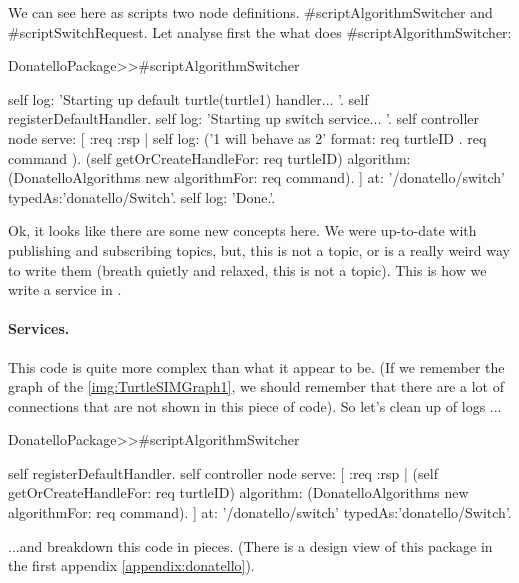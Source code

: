 \documentclass[a4paper,10pt,twoside]{book}
\begin{document}
			
			We can see here as scripts two node definitions. \#scriptAlgorithmSwitcher and \#scriptSwitchRequest. Let analyse first the what does \#scriptAlgorithmSwitcher:
			
			
			
			\begin{code}

DonatelloPackage>>#scriptAlgorithmSwitcher

	self log: 'Starting up default turtle(turtle1) handler... '.
	self registerDefaultHandler.
	self log: 'Starting up switch service... '.
	self controller node serve: [ :req :rsp | 
		self log: ('{1} will behave as {2}' format: {req turtleID . req command} ).
		(self getOrCreateHandleFor: req turtleID)  algorithm: (DonatelloAlgorithms new algorithmFor: req command).		
	] at: '/donatello/switch' typedAs:'donatello/Switch'.
	self log: 'Done.'.

			\end{code}
			
			
			Ok, it looks like there are some new concepts here. We were up-to-date with publishing and subscribing topics, but,  this is not a topic, or is a really weird way to write them (breath quietly and relaxed, this is not a topic). This is how we write a service in  \fwkName{}.
			
			\paragraph{Services. \newline} 
					
			This code is quite more complex than what it appear to be. (If we remember the graph of the  \autoref{img:TurtleSIMGraph1}, we should remember that there are a lot of connections that are not shown in this piece of code). 
			So let's clean up of logs ...
			
			\begin{code}

DonatelloPackage>>#scriptAlgorithmSwitcher

	self registerDefaultHandler.
	self controller node serve: [ :req :rsp | 
		(self getOrCreateHandleFor: req turtleID)  algorithm: (DonatelloAlgorithms new algorithmFor: req command).		
	] at: '/donatello/switch' typedAs:'donatello/Switch'.

			\end{code}	
			
			...and breakdown this code in pieces.  (There is a design view of this package in the first appendix \autoref{appendix:donatello}). 
			
\end{document}
